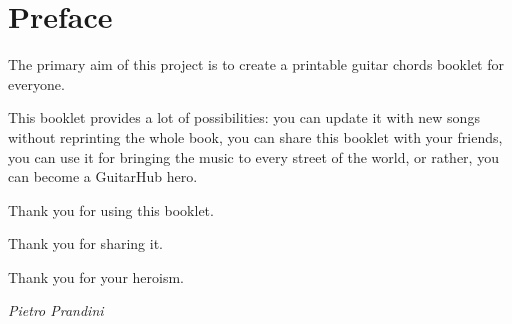 \section*{Preface}
The primary aim of this project is to create a printable guitar chords booklet for everyone.\par
\medskip
This booklet provides a lot of possibilities: you can update it with new songs without reprinting the whole book,
you can share this booklet with your friends, you can use it for bringing the music to every street of the world, or rather, you can become a GuitarHub hero.\par
\medskip
Thank you for using this booklet.\par
\smallskip
Thank you for sharing it.\par
\smallskip
Thank you for your heroism.\par
\bigskip
\begin{flushright}
	{\textit{\rmfamily Pietro Prandini}}\par
\end{flushright}
\newpage
